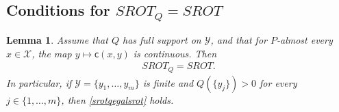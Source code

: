 \documentclass{article}
\newtheorem{lemma}{Lemma}[section]
\begin{document}
\subsection{Conditions for $SROT_Q = SROT$}

\begin{lemma}
  \label{lemme_srotq_equals_srot}
  Assume that $Q$ has full support on $\mathcal{Y}$, and that for $P$-almost every
  $x \in \mathcal{X}$, the map $y \mapsto \mathsf{c}(x,y)$ is continuous. Then
  \begin{align}
    \label{srotqegalsrot}
    SROT_Q = SROT.
  \end{align}
  In particular, if $\mathcal{Y} = \{y_1, \dots, y_m\}$ is finite and
  $Q(\{y_j\}) > 0$ for every $j \in \{1,\dots,m\}$, then \eqref{srotqegalsrot} holds.
\end{lemma}
\end{document}
